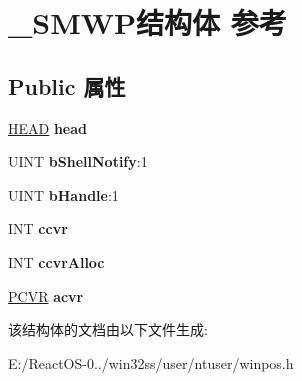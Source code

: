 \hypertarget{struct___s_m_w_p}{}\section{\+\_\+\+S\+M\+W\+P结构体 参考}
\label{struct___s_m_w_p}
\subsection*{Public 属性}
\begin{DoxyCompactItemize}
\item 
\mbox{\label{struct___s_m_w_p_a0db6bd069825d89d1e3e097a28ca4fdd}} 
\hyperlink{struct___h_e_a_d}{H\+E\+AD} {\bfseries head}
\item 
\mbox{\label{struct___s_m_w_p_aad80ae724d1f54136a30867f36169494}} 
U\+I\+NT {\bfseries b\+Shell\+Notify}\+:1
\item 
\mbox{\label{struct___s_m_w_p_a91688c41e3868f463e9c9e7540933a60}} 
U\+I\+NT {\bfseries b\+Handle}\+:1
\item 
\mbox{\label{struct___s_m_w_p_a8bb1596037360e5f3c6d36436d987ff2}} 
I\+NT {\bfseries ccvr}
\item 
\mbox{\label{struct___s_m_w_p_aed7d6a5b928bf6eaf942455d3ca154c0}} 
I\+NT {\bfseries ccvr\+Alloc}
\item 
\mbox{\label{struct___s_m_w_p_a5c72cddd2af9f6f1b72deaf3d285ed07}} 
\hyperlink{struct___c_v_r}{P\+C\+VR} {\bfseries acvr}
\end{DoxyCompactItemize}


该结构体的文档由以下文件生成\+:\begin{DoxyCompactItemize}
\item 
E\+:/\+React\+O\+S-\/0../win32ss/user/ntuser/winpos.\+h\end{DoxyCompactItemize}
